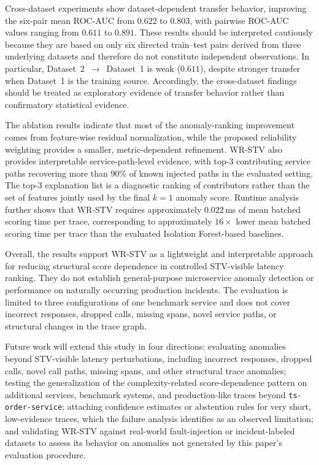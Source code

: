 \documentclass[informatics,article,submit,moreauthors]{Definitions/mdpi}
\newcommand{\rev}[1]{{\color{revisionblue}#1}}
\begin{document}
Cross-dataset experiments show dataset-dependent transfer behavior, improving the six-pair mean ROC-AUC from \(0.622\) to \(0.803\), with pairwise ROC-AUC values ranging from \(0.611\) to \(0.891\). These results should be interpreted cautiously because they are based on only six directed train--test pairs derived from three underlying datasets and therefore do not constitute independent observations. In particular, Dataset~2~\(\rightarrow\)~Dataset~1 is weak (\(0.611\)), despite stronger transfer when Dataset~1 is the training source. Accordingly, the cross-dataset findings should be treated as exploratory evidence of transfer behavior rather than confirmatory statistical evidence.

The ablation results indicate that most of the anomaly-ranking improvement comes from feature-wise residual normalization, while the proposed reliability weighting provides a smaller, metric-dependent refinement. WR-STV also provides interpretable service-path-level evidence, with top-3 contributing service paths recovering more than \(90\%\) of known injected paths in the evaluated setting. \rev {The top-3 explanation list is a diagnostic ranking of contributors rather than the set of features jointly used by the final \(k=1\) anomaly score. Runtime analysis further shows that WR-STV requires approximately \(0.022\)\,ms of mean batched scoring time per trace, corresponding to approximately \(16\times\) lower mean batched scoring time per trace than the evaluated Isolation Forest-based baselines.}

\rev{Overall, the results support WR-STV as a lightweight and interpretable approach for reducing structural score dependence in controlled STV-visible latency ranking. They do not establish general-purpose microservice anomaly detection or performance on naturally occurring production incidents. The evaluation is limited to three configurations of one benchmark service and does not cover incorrect responses, dropped calls, missing spans, novel service paths, or structural changes in the trace graph.}

Future work will extend this study in four directions: evaluating anomalies beyond STV-visible latency perturbations, including \rev{incorrect responses,} dropped calls, novel call paths, missing spans, and other structural trace anomalies; testing the generalization of the complexity-related score-dependence pattern on additional services, benchmark systems, and production-like traces beyond \texttt{ts-order-service}; attaching confidence estimates or abstention rules for very short, low-evidence traces, which the failure analysis identifies as an observed limitation; and validating WR-STV against real-world fault-injection or incident-labeled datasets to assess its behavior on anomalies not generated by this paper's evaluation procedure.
\end{document}
